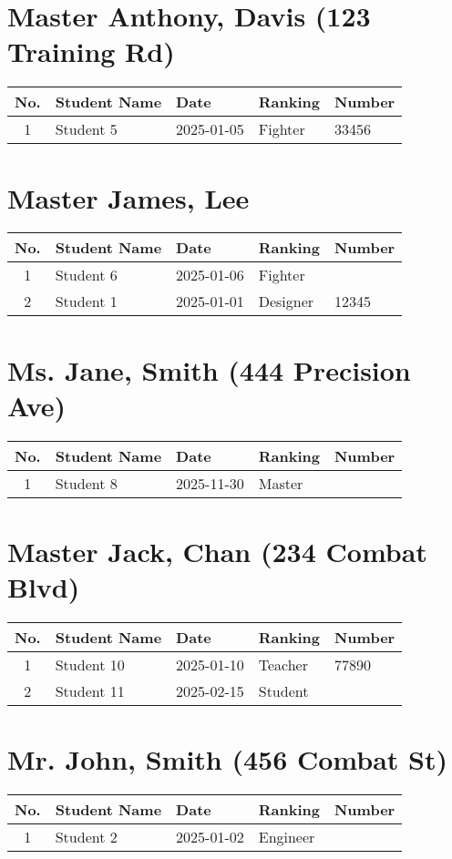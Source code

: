 \documentclass{book}
\begin{document}
\chapter*{Master Anthony, Davis (123 Training Rd)}
\begin{tabularx}{\textwidth}{|c|X|X|X|X|}
\hline
\textbf{No.} & \textbf{Student Name} & \textbf{Date} & \textbf{Ranking} & \textbf{Number} \\
\hline
1 & Student 5 & 2025-01-05 & Fighter & 33456 \\
\hline
\end{tabularx}
\newpage
\chapter*{Master James, Lee}
\begin{tabularx}{\textwidth}{|c|X|X|X|X|}
\hline
\textbf{No.} & \textbf{Student Name} & \textbf{Date} & \textbf{Ranking} & \textbf{Number} \\
\hline
1 & Student 6 & 2025-01-06 & Fighter &  \\
\hline
2 & Student 1 & 2025-01-01 & Designer & 12345 \\
\hline
\end{tabularx}
\newpage
\chapter*{Ms. Jane, Smith (444 Precision Ave)}
\begin{tabularx}{\textwidth}{|c|X|X|X|X|}
\hline
\textbf{No.} & \textbf{Student Name} & \textbf{Date} & \textbf{Ranking} & \textbf{Number} \\
\hline
1 & Student 8 & 2025-11-30 & Master &  \\
\hline
\end{tabularx}
\newpage
\chapter*{Master Jack, Chan (234 Combat Blvd)}
\begin{tabularx}{\textwidth}{|c|X|X|X|X|}
\hline
\textbf{No.} & \textbf{Student Name} & \textbf{Date} & \textbf{Ranking} & \textbf{Number} \\
\hline
1 & Student 10 & 2025-01-10 & Teacher & 77890 \\
\hline
2 & Student 11 & 2025-02-15 & Student &  \\
\hline
\end{tabularx}
\newpage
\chapter*{Mr. John, Smith (456 Combat St)}
\begin{tabularx}{\textwidth}{|c|X|X|X|X|}
\hline
\textbf{No.} & \textbf{Student Name} & \textbf{Date} & \textbf{Ranking} & \textbf{Number} \\
\hline
1 & Student 2 & 2025-01-02 & Engineer &  \\
\hline
\end{tabularx}
\newpage
\end{document}
